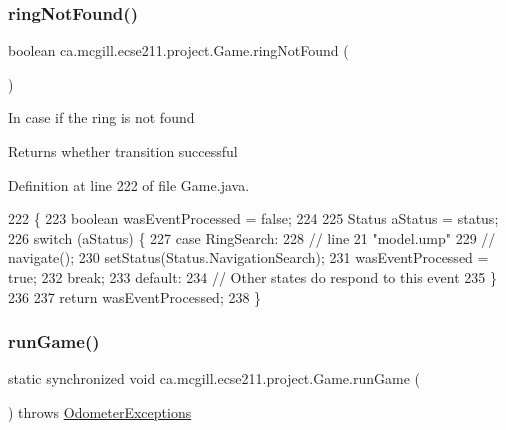 \subsubsection{\texorpdfstring{ring\+Not\+Found()}{ringNotFound()}}
{\footnotesize\ttfamily boolean ca.\+mcgill.\+ecse211.\+project.\+Game.\+ring\+Not\+Found (\begin{DoxyParamCaption}{ }\end{DoxyParamCaption})}

In case if the ring is not found

\begin{DoxyReturn}{Returns}
whether transition successful 
\end{DoxyReturn}


Definition at line 222 of file Game.\+java.


\begin{DoxyCode}
222                                 \{
223     \textcolor{keywordtype}{boolean} wasEventProcessed = \textcolor{keyword}{false};
224 
225     Status aStatus = status;
226     \textcolor{keywordflow}{switch} (aStatus) \{
227       \textcolor{keywordflow}{case} RingSearch:
228         \textcolor{comment}{// line 21 "model.ump"}
229         \textcolor{comment}{// navigate();}
230         setStatus(Status.NavigationSearch);
231         wasEventProcessed = \textcolor{keyword}{true};
232         \textcolor{keywordflow}{break};
233       \textcolor{keywordflow}{default}:
234         \textcolor{comment}{// Other states do respond to this event}
235     \}
236 
237     \textcolor{keywordflow}{return} wasEventProcessed;
238   \}
\end{DoxyCode}
\mbox{\label{enumca_1_1mcgill_1_1ecse211_1_1project_1_1_game_a790740a4ed299c9b985401ea8c4d5010}} 
\subsubsection{\texorpdfstring{run\+Game()}{runGame()}}
{\footnotesize\ttfamily static synchronized void ca.\+mcgill.\+ecse211.\+project.\+Game.\+run\+Game (\begin{DoxyParamCaption}{ }\end{DoxyParamCaption}) throws \hyperlink{classca_1_1mcgill_1_1ecse211_1_1odometer_1_1_odometer_exceptions}{Odometer\+Exceptions}\hspace{0.3cm}{\ttfamily [static]}}

